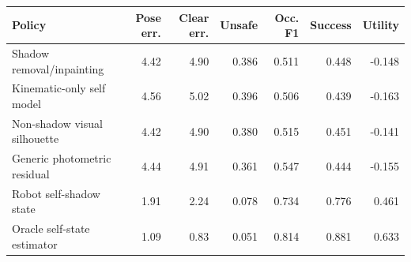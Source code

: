 \begin{tabular}{lrrrrrr}
\toprule
Policy & Pose err. & Clear err. & Unsafe & Occ. F1 & Success & Utility \\
\midrule
Shadow removal/inpainting & 4.42 & 4.90 & 0.386 & 0.511 & 0.448 & -0.148 \\
Kinematic-only self model & 4.56 & 5.02 & 0.396 & 0.506 & 0.439 & -0.163 \\
Non-shadow visual silhouette & 4.42 & 4.90 & 0.380 & 0.515 & 0.451 & -0.141 \\
Generic photometric residual & 4.44 & 4.91 & 0.361 & 0.547 & 0.444 & -0.155 \\
Robot self-shadow state & 1.91 & 2.24 & 0.078 & 0.734 & 0.776 & 0.461 \\
Oracle self-state estimator & 1.09 & 0.83 & 0.051 & 0.814 & 0.881 & 0.633 \\
\bottomrule
\end{tabular}
